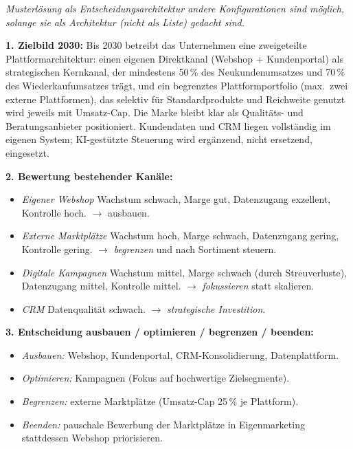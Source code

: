 \documentclass[11pt,a4paper,oneside]{article}
\begin{document}
\begin{loesungbox}
\emph{Musterlösung als Entscheidungsarchitektur \textendash{} andere Konfigurationen sind möglich, solange sie als Architektur (nicht als Liste) gedacht sind.}

\smallskip
\textbf{1. Zielbild 2030:}
Bis 2030 betreibt das Unternehmen eine zweigeteilte Plattformarchitektur: einen eigenen Direktkanal (Webshop + Kundenportal) als strategischen Kernkanal, der mindestens 50\,\% des Neukundenumsatzes und 70\,\% des Wiederkaufumsatzes trägt, und ein begrenztes Plattformportfolio (max.\ zwei externe Plattformen), das selektiv für Standardprodukte und Reichweite genutzt wird \textendash{} jeweils mit Umsatz-Cap. Die Marke bleibt klar als Qualitäts- und Beratungsanbieter positioniert. Kundendaten und CRM liegen vollständig im eigenen System; KI-gestützte Steuerung wird ergänzend, nicht ersetzend, eingesetzt.

\smallskip
\textbf{2. Bewertung bestehender Kanäle:}
\begin{itemize}
  \item \emph{Eigener Webshop} \textendash{} Wachstum schwach, Marge gut, Datenzugang exzellent, Kontrolle hoch. $\rightarrow$ ausbauen.
  \item \emph{Externe Marktplätze} \textendash{} Wachstum hoch, Marge schwach, Datenzugang gering, Kontrolle gering. $\rightarrow$ \emph{begrenzen} und nach Sortiment steuern.
  \item \emph{Digitale Kampagnen} \textendash{} Wachstum mittel, Marge schwach (durch Streuverluste), Datenzugang mittel, Kontrolle mittel. $\rightarrow$ \emph{fokussieren} statt skalieren.
  \item \emph{CRM} \textendash{} Datenqualität schwach. $\rightarrow$ \emph{strategische Investition}.
\end{itemize}

\textbf{3. Entscheidung \textendash{} ausbauen / optimieren / begrenzen / beenden:}
\begin{itemize}
  \item \emph{Ausbauen:} Webshop, Kundenportal, CRM-Konsolidierung, Datenplattform.
  \item \emph{Optimieren:} Kampagnen (Fokus auf hochwertige Zielsegmente).
  \item \emph{Begrenzen:} externe Marktplätze (Umsatz-Cap 25\,\% je Plattform).
  \item \emph{Beenden:} pauschale Bewerbung der Marktplätze in Eigenmarketing \textendash{} stattdessen Webshop priorisieren.
\end{itemize}


\end{loesungbox}
\end{document}
